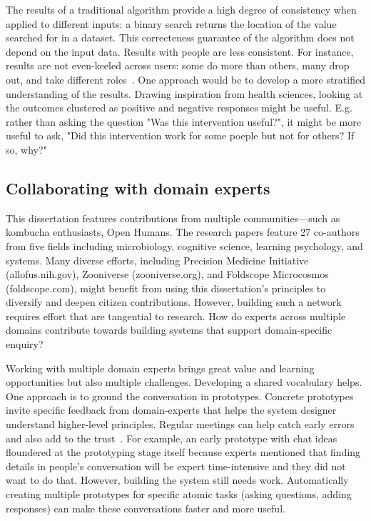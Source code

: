 The results of a traditional algorithm provide a high degree of consistency when applied to different inputs: a binary search returns the location of the value searched for in a dataset. This correcteness guarantee of the algorithm does not depend on the input data. Results with people are less consistent. For instance, results are not even-keeled across users: some do more than others, many drop out, and take different roles~\cite{Bryant2005}. One approach would be to develop a more stratified understanding of the results. Drawing inspiration from health sciences, looking at the outcomes clustered as positive and negative responses might be useful. E.g. rather than asking the question "Was this intervention useful?", it might be more useful to ask, "Did this intervention work for some poeple but not for others? If so, why?"



\subsection{Collaborating with domain experts}
This dissertation features contributions from multiple communities—such as kombucha enthusiasts, Open Humans. The research papers feature 27 co-authors from five fields including microbiology, cognitive science, learning psychology, and systems. Many diverse efforts, including Precision Medicine Initiative (allofus.nih.gov), Zooniverse (zooniverse.org), and Foldscope Microcosmos (foldscope.com), might benefit from using this dissertation’s principles to diversify and deepen citizen contributions. However, building such a network requires effort that are tangential to research. How do experts across multiple domains contribute towards building systems that support domain-specific enquiry? 

Working with multiple domain experts brings great value and learning opportunities but also multiple challenges. Developing a shared vocabulary helps. One approach is to ground the conversation in prototypes. Concrete prototypes invite specific feedback from domain-experts that helps the system designer understand higher-level principles. Regular meetings can help catch early errors and also add to the trust~\cite{rocco1998trust}. For example, an early prototype with chat ideas floundered at the prototyping stage itself because experts mentioned that finding details in people's conversation will be expert time-intensive and they did not want to do that. However, building the system still needs work. Automatically creating multiple prototypes for specific atomic tasks (asking questions, adding responses) can make these conversations faster and more useful.

